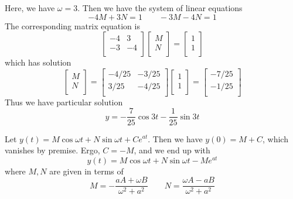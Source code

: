 \documentclass[a4paper]{article}
\begin{document}
Here, we have \(\omega = 3\). Then we have the system of linear equations
\[
	-4M + 3N = 1 \qquad -3M - 4N = 1
\]
The corresponding matrix equation is
\[
	\begin{bmatrix}
		-4 & 3 \\
		-3 & -4 \\
	\end{bmatrix}
\begin{bmatrix}
	M \\
	N \\
\end{bmatrix}
=
\begin{bmatrix}
	1 \\
	1 \\
\end{bmatrix}
\]
which has solution
\[
	\begin{bmatrix}
		M \\
		N \\
	\end{bmatrix}
=
\begin{bmatrix}
	-4/25 & -3/25 \\
	3/25 & -4/25 \\
\end{bmatrix}
\begin{bmatrix}
	1 \\
	1 \\
\end{bmatrix}
=
\begin{bmatrix}
	-7/25 \\
	-1/25 \\
\end{bmatrix}
\]
Thus we have particular solution
\[
	y = -\frac{7}{25} \cos 3t -\frac{1}{25} \sin 3t 
\]


Let \(y \!\left( t \right) = M \cos \omega t + N \sin \omega t + Ce^{at}\). Then we have \(y \!\left( 0 \right) = M + C\), which vanishes by premise. Ergo, \(C = - M\), and we end up with
\[
	y \!\left( t \right) = M \cos \omega t + N \sin \omega t - M e^{at}
\]
where \(M, N\) are given in terms of
\[
	M = -\frac{aA + \omega B}{\omega^{2} + a^{2}} \qquad N = \frac{\omega A - aB}{\omega^{2} + a^{2}}
\]

\end{document}

